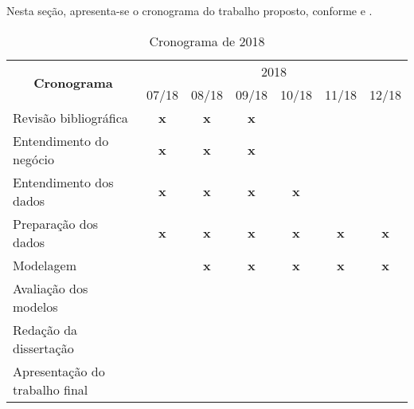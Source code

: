 \label{cap:Cronograma}%
Nesta seção, apresenta-se o cronograma do trabalho proposto, conforme  e .


\begin{small}
\begin{table} [!htbp] 
\centering
\caption{Cronograma de 2018}
\label{cronograma2018}
\begin{tabular}{|l|c|c|c|c|c|c|}
\hline
\multicolumn{1}{|c|}{\multirow{2}{*}{\textbf{Cronograma}}} & \multicolumn{6}{c|}{2018}                                                   \\ \cline{2-7} 
\multicolumn{1}{|c|}{}                                     & 07/18      & 08/18      & 09/18      & 10/18      & 11/18      & 12/18      \\ \hline
Revisão bibliográfica                                      & \textbf{x} & \textbf{x} & \textbf{x} & \textbf{}  & \textbf{}  & \textbf{}  \\ \hline
Entendimento do negócio                                    & \textbf{x} & \textbf{x} & \textbf{x} & \textbf{}  & \textbf{}  & \textbf{}  \\ \hline
Entendimento dos dados                                     & \textbf{x} & \textbf{x} & \textbf{x} & \textbf{x} & \textbf{}  & \textbf{}  \\ \hline
Preparação dos dados                                       & \textbf{x}  & \textbf{x} & \textbf{x} & \textbf{x} & \textbf{x} & \textbf{x} \\ \hline
Modelagem                                                  & \textbf{}  & \textbf{x}  & \textbf{x} & \textbf{x} & \textbf{x} & \textbf{x} \\ \hline
Avaliação dos modelos                                      & \textbf{}  & \textbf{}  & \textbf{}  & \textbf{}  & \textbf{}  & \textbf{}  \\ \hline
Redação da dissertação                                     & \textbf{}  & \textbf{}  & \textbf{}  & \textbf{}  & \textbf{}  & \textbf{}  \\ \hline
Apresentação do trabalho final                             & \textbf{}  & \textbf{}  & \textbf{}  & \textbf{}  & \textbf{}  & \textbf{}  \\ \hline
\end{tabular}
\end{table}
\end{small}


